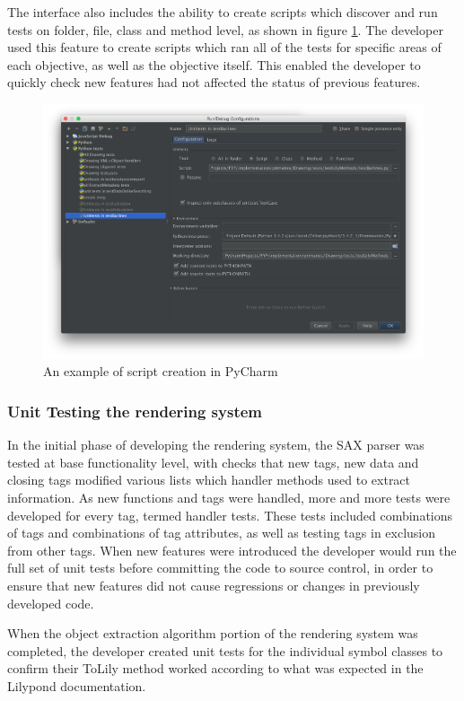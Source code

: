The interface also includes the ability to create scripts which discover and run tests on folder, file, class and method level, as shown in figure \ref{fig:testscript}. The developer used this feature to create scripts which ran all of the tests for specific areas of each objective, as well as the objective itself. This enabled the developer to quickly check new features had not affected the status of previous features. 
\begin{figure}[H]
	\centering
	\includegraphics[width=400pt]{create_test_script}	
	\caption{An example of script creation in PyCharm}
	\label{fig:testscript}
\end{figure}
\subsubsection{Unit Testing the rendering system}
In the initial phase of developing the rendering system, the SAX parser was tested at base functionality level, with checks that new tags, new data and closing tags modified various lists which handler methods used to extract information. As new functions and tags were handled, more and more tests were developed for every tag, termed handler tests. These tests included combinations of tags and combinations of tag attributes, as well as testing tags in exclusion from other tags. When new features were introduced the developer would run the full set of unit tests before committing the code to source control, in order to ensure that new features did not cause regressions or changes in previously developed code.

When the object extraction algorithm portion of the rendering system was completed, the developer created unit tests for the individual symbol classes to confirm their ToLily method worked according to what was expected in the Lilypond documentation. 


